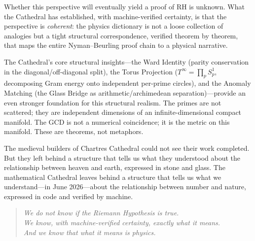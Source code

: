 Whether this perspective will eventually yield a proof of RH is
unknown. What the Cathedral has established, with machine-verified
certainty, is that the perspective is \emph{coherent}: the physics
dictionary is not a loose collection of analogies but a tight
structural correspondence, verified theorem by theorem, that maps
the entire Nyman--Beurling proof chain to a physical narrative.

The Cathedral's core structural insights---the Ward Identity
(parity conservation in the diagonal/off-diagonal split), the
Torus Projection ($T^\infty = \prod_p S^1_p$, decomposing Gram
energy onto independent per-prime circles), and the Anomaly
Matching (the Glass Bridge as arithmetic/archimedean
separation)---provide an even stronger
foundation for this structural realism. The primes are not scattered;
they are independent dimensions of an infinite-dimensional
compact manifold. The GCD is not a numerical coincidence; it is
the metric on this manifold. These are theorems, not metaphors.

The medieval builders of Chartres Cathedral could not see their
work completed. But they left behind a structure that tells us
what they understood about the relationship between heaven and
earth, expressed in stone and glass. The mathematical Cathedral
leaves behind a structure that tells us what we understand---in
June 2026---about the relationship between number and nature,
expressed in code and verified by machine.

\begin{quote}
\emph{We do not know if the Riemann Hypothesis is true.\\
We know, with machine-verified certainty, exactly what it means.\\
And we know that what it means is physics.}
\end{quote}
